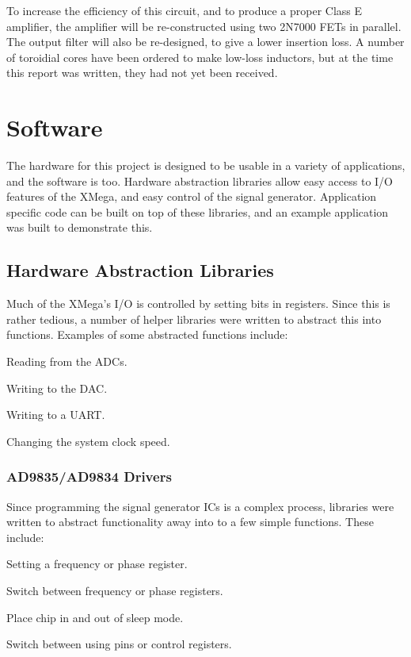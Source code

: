 \documentclass[a4paper,12pt]{article}
\newenvironment{packed_itemize}{
\begin{itemize}
  \setlength{\itemsep}{1pt}
  \setlength{\parskip}{0pt}
  \setlength{\parsep}{0pt}
}{\end{itemize}}
\begin{document}
To increase the efficiency of this circuit, and to produce a proper Class E amplifier, the amplifier will be re-constructed using two 2N7000 FETs in parallel. The output filter will also be re-designed, to give a lower insertion loss. A number of toroidial cores have been ordered to make low-loss inductors, but at the time this report was written, they had not yet been received. 



\section{Software}
The hardware for this project is designed to be usable in a variety of applications, and the software is too. Hardware abstraction libraries allow easy access to I/O features of the XMega, and easy control of the signal generator. Application specific code can be built on top of these libraries, and an example application was built to demonstrate this. 

\subsection{Hardware Abstraction Libraries}
Much of the XMega's I/O is controlled by setting bits in registers. Since this is rather tedious, a number of helper libraries were written to abstract this into functions. Examples of some abstracted functions include:
\begin{packed_itemize}
\item Reading from the ADCs.
\item Writing to the DAC.
\item Writing to a UART.
\item Changing the system clock speed.
\end{packed_itemize}

\subsubsection{AD9835/AD9834 Drivers}
Since programming the signal generator ICs is a complex process, libraries were written to abstract functionality away into to a few simple functions. These include:
\begin{packed_itemize}
\item Setting a frequency or phase register.
\item Switch between frequency or phase registers.
\item Place chip in and out of sleep mode.
\item Switch between using pins or control registers.
\end{packed_itemize}
\end{document}
